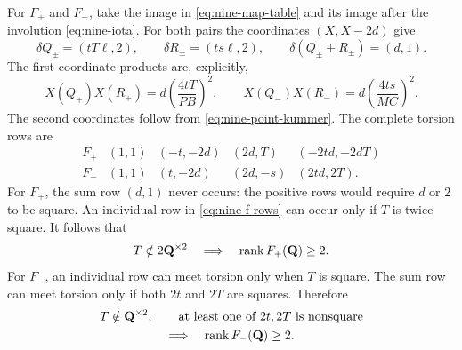 For $F_+$ and $F_-$, take the image in
\eqref{eq:nine-map-table} and its image after the involution
\eqref{eq:nine-iota}.  For both pairs the coordinates $(X,X-2d)$ give
\begin{equation}\label{eq:nine-f-rows}
 \delta Q_\pm=(tT\ell,2),\qquad
 \delta R_\pm=(ts\ell,2),\qquad
 \delta(Q_\pm+R_\pm)=(d,1).
\end{equation}
The first-coordinate products are, explicitly,
\[
 X(Q_+)X(R_+)=d\left(\frac{4tT}{PB}\right)^2,\qquad
 X(Q_-)X(R_-)=d\left(\frac{4ts}{MC}\right)^2.
\]
The second coordinates follow from \eqref{eq:nine-point-kummer}.
The complete torsion rows are
\begin{equation}\label{eq:nine-f-torsion}
\begin{array}{c|cccc}
 F_+&(1,1)&(-t,-2d)&(2d,T)&(-2td,-2dT)\\
 F_-&(1,1)&(t,-2d)&(2d,-s)&(2td,2T).
\end{array}
\end{equation}
For $F_+$, the sum row $(d,1)$ never occurs: the positive rows
would require $d$ or $2$ to be square.  An individual row in
\eqref{eq:nine-f-rows} can occur only if $T$ is twice square.
It follows that
\begin{equation}\label{eq:nine-fplus-two}
 T\notin2\mathbf Q^{\times2}\quad\Longrightarrow\quad\operatorname{rank} F_+(\mathbf Q)\ge2.
\end{equation}
For $F_-$, an individual row can meet torsion only when $T$ is
square.  The sum row can meet torsion only if both $2t$ and $2T$
are squares.  Therefore
\begin{equation}\label{eq:nine-fminus-two}
\begin{gathered}
 T\notin\mathbf Q^{\times2},\qquad
 \text{at least one of $2t,2T$ is nonsquare}
 \\
 \Longrightarrow\quad\operatorname{rank} F_-(\mathbf Q)\ge2.
\end{gathered}
\end{equation}

